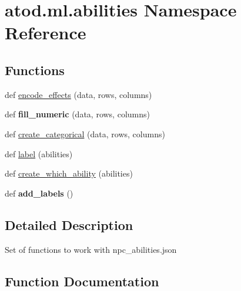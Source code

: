 \hypertarget{namespaceatod_1_1ml_1_1abilities}{}\section{atod.\+ml.\+abilities Namespace Reference}
\label{namespaceatod_1_1ml_1_1abilities}
\subsection*{Functions}
\begin{DoxyCompactItemize}
\item 
def \hyperlink{namespaceatod_1_1ml_1_1abilities_a79422e57b75f32749f2020b374ad8d68}{encode\+\_\+effects} (data, rows, columns)
\item 
def {\bfseries fill\+\_\+numeric} (data, rows, columns)\hypertarget{namespaceatod_1_1ml_1_1abilities_af0422b3fb812d61b24ca24939d6527c1}{}\label{namespaceatod_1_1ml_1_1abilities_af0422b3fb812d61b24ca24939d6527c1}

\item 
def \hyperlink{namespaceatod_1_1ml_1_1abilities_a2e2cb7ebca7d8e18b9cfb0113a8f5da0}{create\+\_\+categorical} (data, rows, columns)
\item 
def \hyperlink{namespaceatod_1_1ml_1_1abilities_ace5515a17627d9dfe112c4035e21ff12}{label} (abilities)
\item 
def \hyperlink{namespaceatod_1_1ml_1_1abilities_a70c5ff37b227cf181eea9ffb1da5013e}{create\+\_\+which\+\_\+ability} (abilities)
\item 
def {\bfseries add\+\_\+labels} ()\hypertarget{namespaceatod_1_1ml_1_1abilities_a312168bb6d76a1cd919116e614fdba67}{}\label{namespaceatod_1_1ml_1_1abilities_a312168bb6d76a1cd919116e614fdba67}

\end{DoxyCompactItemize}


\subsection{Detailed Description}
\begin{DoxyVerb}Set of functions to work with npc_abilities.json\end{DoxyVerb}
 

\subsection{Function Documentation}
